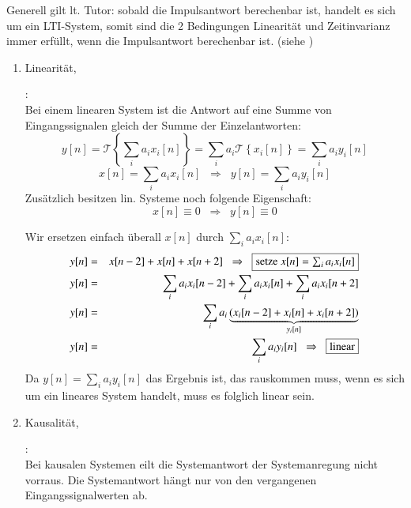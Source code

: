 \begin{uebsp}
\begin{Answer}
\begin{enumerate}[a)]
            Generell gilt lt. Tutor: sobald die Impulsantwort berechenbar ist,
            handelt es sich um ein LTI-System, somit sind die 2 Bedingungen
            Linearität und Zeitinvarianz immer erfüllt, wenn die Impulsantwort
            berechenbar ist. (siehe )
            \begin{enumerate}[1)]
                \item Linearität,
                    \begin{definition}:\\
                        Bei einem linearen System ist die Antwort auf eine Summe
                        von Eingangssignalen gleich der Summe der
                        Einzelantworten:
                        \[y[n]=\mathcal{T}\left\{\sum_ia_ix_i[n]\right\}
                            =\sum_ia_i\mathcal{T}\left\{x_i[n]\right\}
                        =\sum_ia_iy_i[n]\]
                        \[x[n]=\sum_i a_ix_i[n]\;\;\Rightarrow\;\;y[n]=\sum_ia_iy_i[n]\]
                        Zusätzlich besitzen lin. Systeme noch folgende
                        Eigenschaft:
                        \[x[n]\equiv0\;\;\Rightarrow\;\;y[n]\equiv0\]
                    \end{definition}
                    Wir ersetzen einfach überall $x[n]$ durch $\sum_ia_ix_i[n]$:
                \begin{eqnarray*}
                    y[n]&=&x[n-2]+x[n]+x[n+2]\;\;\Rightarrow\;\;\fbox{setze $x[n]=\sum_ia_ix_i[n]$}\\
                    y[n]&=&\sum_ia_ix_i[n-2]+\sum_ia_ix_i[n]+\sum_ia_ix_i[n+2]\\
                    y[n]&=&\sum_ia_i\underbrace{(x_i[n-2]+x_i[n]+x_i[n+2])}_{y_i[n]}\\
                    y[n]&=&\sum_ia_i{y_i[n]}\;\;\Rightarrow\;\;\fbox{linear}
                \end{eqnarray*}
                Da $y[n]=\sum_ia_i{y_i[n]}$ das Ergebnis ist, das rauskommen
                muss, wenn es sich um ein lineares System handelt, muss es
                folglich linear sein.
                \item Kausalität,
                    \begin{definition}[Kausalität]:\\
                        Bei kausalen Systemen eilt die Systemantwort der
                        Systemanregung nicht vorraus. Die Systemantwort hängt
                        nur von den vergangenen Eingangssignalwerten ab.

\end{definition}
\end{enumerate}
\end{enumerate}
\end{Answer}
\end{uebsp}
